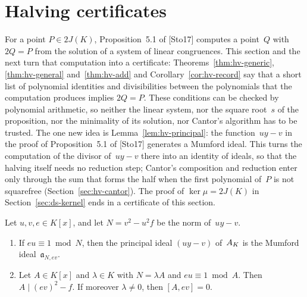 \section{Halving certificates}
\label{sec:hv-certificates}

For a point $P \in 2J(K)$, Proposition~5.1 of [Sto17] computes a point~$Q$ with $2Q = P$ from the
solution of a system of linear congruences. This section and the next turn that computation into
a certificate: Theorems~\ref{thm:hv-generic}, \ref{thm:hv-general} and~\ref{thm:hv-add} and
Corollary~\ref{cor:hv-record} say that a short list of polynomial identities and divisibilities
between the polynomials that the computation produces implies $2Q = P$. These conditions can be
checked by polynomial arithmetic, so neither the linear system, nor the square root~$s$ of the
proposition, nor the minimality of its solution, nor Cantor's algorithm has to be trusted. The
one new idea is Lemma~\ref{lem:hv-principal}: the function~$uy - v$ in the proof of
Proposition~5.1 of [Sto17] generates a Mumford ideal. This turns the computation of the divisor
of~$uy - v$ there into an identity of ideals, so that the halving itself needs no reduction step;
Cantor's composition and reduction enter only through the sum that forms the half when the first
polynomial of~$P$ is not squarefree (Section~\ref{sec:hv-cantor}). The proof of
$\ker\mu = 2J(K)$ in Section~\ref{sec:ds-kernel} ends in a certificate of this section.

\begin{lemma}
\label{lem:hv-principal}
\leanok
{}
Let $u, v, e \in K[x]$, and let $N = v^2 - u^2 f$ be the norm of~$uy - v$.
\begin{enumerate}
  \item If $eu \equiv 1 \bmod N$, then the principal ideal $(uy - v)$ of~$A_{K}$ is the Mumford
    ideal~$\mathfrak a_{N, ev}$.
  \item Let $A \in K[x]$ and $\lambda \in K$ with $N = \lambda A$ and $eu \equiv 1 \bmod A$. Then
    $A \mid (ev)^2 - f$. If moreover $\lambda \ne 0$, then $[A, ev] = 0$.
\end{enumerate}
\end{lemma}

